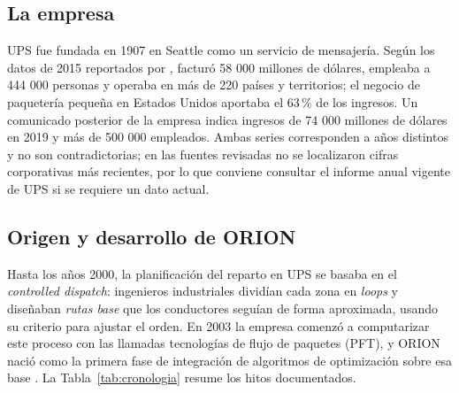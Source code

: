 \documentclass[11pt,a4paper]{article}
\begin{document}
\subsection{La empresa}
UPS fue fundada en 1907 en Seattle como un servicio de mensajería. Según los datos de 2015 reportados por \textcite{holland2017}, facturó 58 000 millones de dólares, empleaba a 444 000 personas y operaba en más de 220 países y territorios; el negocio de paquetería pequeña en Estados Unidos aportaba el 63\,\% de los ingresos. Un comunicado posterior de la empresa \parencite{ups2020} indica ingresos de 74 000 millones de dólares en 2019 y más de 500 000 empleados. Ambas series corresponden a años distintos y no son contradictorias; en las fuentes revisadas no se localizaron cifras corporativas más recientes, por lo que conviene consultar el informe anual vigente de UPS si se requiere un dato actual.

\subsection{Origen y desarrollo de ORION}
Hasta los años 2000, la planificación del reparto en UPS se basaba en el \emph{controlled dispatch}: ingenieros industriales dividían cada zona en \emph{loops} y diseñaban \emph{rutas base} que los conductores seguían de forma aproximada, usando su criterio para ajustar el orden. En 2003 la empresa comenzó a computarizar este proceso con las llamadas tecnologías de flujo de paquetes (PFT), y ORION nació como la primera fase de integración de algoritmos de optimización sobre esa base \parencite{holland2017}. La Tabla~\ref{tab:cronologia} resume los hitos documentados.
\end{document}
